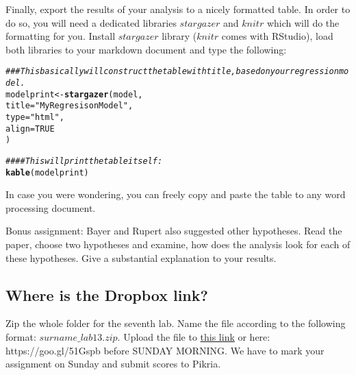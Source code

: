 \documentclass{article}\usepackage[]{graphicx}\usepackage[]{color}
\makeatletter
\newcommand{\hlnum}[1]{\textcolor[rgb]{0.686,0.059,0.569}{#1}}%
\newcommand{\hlstr}[1]{\textcolor[rgb]{0.192,0.494,0.8}{#1}}%
\newcommand{\hlcom}[1]{\textcolor[rgb]{0.678,0.584,0.686}{\textit{#1}}}%
\newcommand{\hlstd}[1]{\textcolor[rgb]{0.345,0.345,0.345}{#1}}%
\newcommand{\hlkwb}[1]{\textcolor[rgb]{0.69,0.353,0.396}{#1}}%
\newcommand{\hlkwc}[1]{\textcolor[rgb]{0.333,0.667,0.333}{#1}}%
\newcommand{\hlkwd}[1]{\textcolor[rgb]{0.737,0.353,0.396}{\textbf{#1}}}%
\newenvironment{kframe}{%
 \def\at@end@of@kframe{}%
 \ifinner\ifhmode%
  \def\at@end@of@kframe{\end{minipage}}%
  \begin{minipage}{\columnwidth}%
 \fi\fi%
 \def\FrameCommand##1{\hskip\@totalleftmargin \hskip-\fboxsep
 \colorbox{shadecolor}{##1}\hskip-\fboxsep
     \hskip-\linewidth \hskip-\@totalleftmargin \hskip\columnwidth}%
 \MakeFramed {\advance\hsize-\width
   \@totalleftmargin\z@ \linewidth\hsize
   \@setminipage}}%
 {\par\unskip\endMakeFramed%
 \at@end@of@kframe}
\newenvironment{knitrout}{}{} %
\makeatother
\begin{document}
Finally, export the results of your analysis to a nicely formatted table. In order to do so, you will need a dedicated libraries $stargazer$ and $knitr$ which will do the formatting for you. Install $stargazer$ library ($knitr$ comes with RStudio), load both libraries to your markdown document and type the following:


\begin{knitrout}
\color{fgcolor}\begin{kframe}
\begin{alltt}
\hlcom{### This basically will construct the table with title, based on your regression model. }
\hlstd{modelprint} \hlkwb{<-} \hlkwd{stargazer}\hlstd{(model,}
                        \hlkwc{title}\hlstd{=}\hlstr{"My Regresison Model"}\hlstd{,}
                        \hlkwc{type} \hlstd{=} \hlstr{"html"}\hlstd{,}
                        \hlkwc{align}\hlstd{=}\hlnum{TRUE}
                        \hlstd{)}

\hlcom{#### This will print the table itself:}
\hlkwd{kable}\hlstd{(modelprint)}
\end{alltt}
\end{kframe}
\end{knitrout}

In case you were wondering, you can freely copy and paste the table to any word processing document.


Bonus assignment: Bayer and Rupert also suggested other hypotheses. Read the paper, choose two hypotheses and examine, how does the analysis look for each of these hypotheses. Give a substantial explanation to your results.


\subsection*{Where is the Dropbox link?}

Zip the whole folder for the seventh lab. Name the file according to the following format: $surname\_lab13.zip$. Upload the file to \href{https://www.dropbox.com/request/RmKfWCvWKZJHDXdnYFwK}{this link} or here: https://goo.gl/51Gspb before SUNDAY MORNING. We have to mark your assignment on Sunday and submit scores to Pikria.
\end{document}
